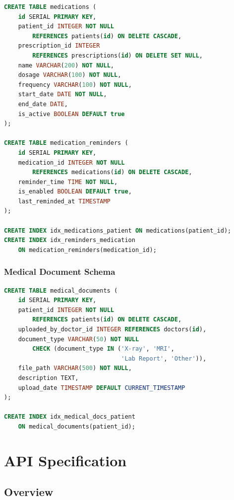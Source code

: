 \documentclass[11pt,a4paper]{article}
\begin{document}
\begin{lstlisting}[language=SQL, caption=Medication and Reminder Tables]
CREATE TABLE medications (
    id SERIAL PRIMARY KEY,
    patient_id INTEGER NOT NULL 
        REFERENCES patients(id) ON DELETE CASCADE,
    prescription_id INTEGER 
        REFERENCES prescriptions(id) ON DELETE SET NULL,
    name VARCHAR(200) NOT NULL,
    dosage VARCHAR(100) NOT NULL,
    frequency VARCHAR(100) NOT NULL,
    start_date DATE NOT NULL,
    end_date DATE,
    is_active BOOLEAN DEFAULT true
);

CREATE TABLE medication_reminders (
    id SERIAL PRIMARY KEY,
    medication_id INTEGER NOT NULL 
        REFERENCES medications(id) ON DELETE CASCADE,
    reminder_time TIME NOT NULL,
    is_enabled BOOLEAN DEFAULT true,
    last_reminded_at TIMESTAMP
);

CREATE INDEX idx_medications_patient ON medications(patient_id);
CREATE INDEX idx_reminders_medication 
    ON medication_reminders(medication_id);
\end{lstlisting}

\subsubsection{Medical Document Schema}

\begin{lstlisting}[language=SQL, caption=Medical Document Table Schema]
CREATE TABLE medical_documents (
    id SERIAL PRIMARY KEY,
    patient_id INTEGER NOT NULL 
        REFERENCES patients(id) ON DELETE CASCADE,
    uploaded_by_doctor_id INTEGER REFERENCES doctors(id),
    document_type VARCHAR(50) NOT NULL 
        CHECK (document_type IN ('X-ray', 'MRI', 
                                 'Lab Report', 'Other')),
    file_path VARCHAR(500) NOT NULL,
    description TEXT,
    upload_date TIMESTAMP DEFAULT CURRENT_TIMESTAMP
);

CREATE INDEX idx_medical_docs_patient 
    ON medical_documents(patient_id);
\end{lstlisting}

\clearpage

\section{API Specification}

\subsection{Overview}
\end{document}
